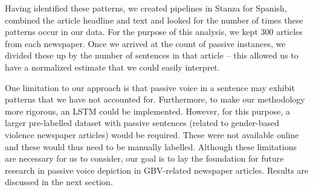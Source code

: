 \documentclass{article}
\begin{document}
{{Having identified these patterns, we created pipelines in Stanza for Spanish, combined the article headline and text and looked for the number of times these patterns occur in our data. For the purpose of this analysis, we kept 300 articles from each newspaper. Once we arrived at the count of passive instances, we divided these up by the number of sentences in that article – this allowed us to have a normalized estimate that we could easily interpret.

One limitation to our approach is that passive voice in a sentence may exhibit patterns that we have not accounted for. Furthermore, to make our methodology more rigorous, an LSTM could be implemented. However, for this purpose, a larger pre-labelled dataset with passive sentences (related to gender-based violence newspaper articles) would be required. These were not available online and these would thus need to be manually labelled. Although these limitations are necessary for us to consider, our goal is to lay the foundation for future research in passive voice depiction in GBV-related newspaper articles. Results are discussed in the next section.

}
}
\end{document}
